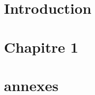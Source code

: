 \documentclass[12pt,twoside]{report}
\begin{document}
\chapter{Introduction} %


\chapter{Chapitre 1} %


\appendix

\printbibliography

\chapter{annexes} %

\end{document}

